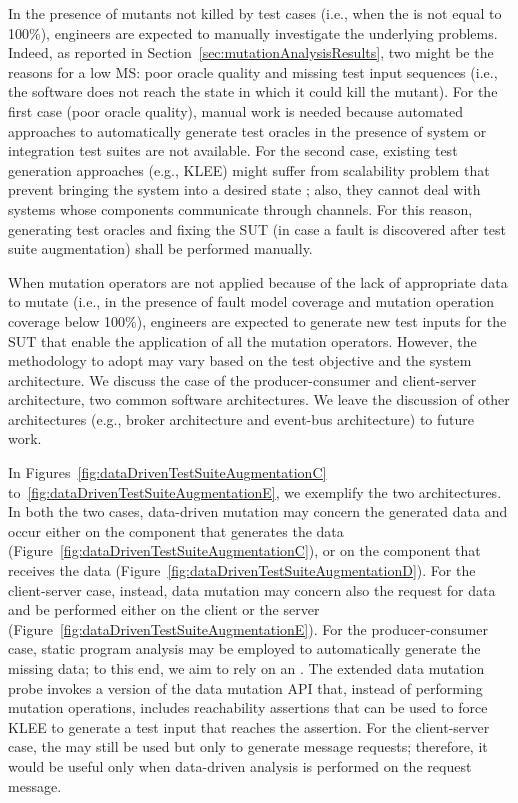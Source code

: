 In the presence of mutants not killed by test cases (i.e., when the   is not equal to 100\%), engineers are expected to manually investigate the underlying problems. Indeed, as reported in Section~\ref{sec:mutationAnalysisResults}, two might be the reasons for a low MS: poor oracle quality and missing test input sequences (i.e., the software does not reach the state in which it could kill the mutant).
For the first case (poor oracle quality), manual work is needed because automated approaches to automatically generate test oracles in the presence of system or integration test suites are not available. For the second case, existing test generation approaches (e.g., KLEE) might suffer from scalability problem that prevent bringing the system into a desired state ; also, they cannot deal with systems whose components communicate through channels. For this reason, generating test oracles and fixing the SUT (in case a fault is discovered after test suite augmentation) shall be performed manually.

When mutation operators are not applied because of the lack of appropriate data to mutate (i.e., in the presence of fault model coverage and mutation operation coverage below 100\%), engineers are expected to generate new test inputs for the SUT that enable the application of all the mutation operators. 
However, the methodology to adopt may vary based on the test objective and the system architecture. 
We discuss the case of the producer-consumer and client-server architecture, two common software architectures. We leave the discussion of other architectures (e.g., broker architecture and event-bus architecture) to future work.

\STARTCHANGEDFINAL

In Figures~\ref{fig:dataDrivenTestSuiteAugmentationC} to~\ref{fig:dataDrivenTestSuiteAugmentationE}, we exemplify the two architectures. In both the two cases, data-driven mutation may concern the generated data and occur either on the component that generates the data (Figure~\ref{fig:dataDrivenTestSuiteAugmentationC}), or on the component that receives the data (Figure~\ref{fig:dataDrivenTestSuiteAugmentationD}).
For the client-server case, instead, data mutation may concern also the request for data and be performed either on the client or the server (Figure~\ref{fig:dataDrivenTestSuiteAugmentationE}). For the producer-consumer case, static program analysis may be employed to automatically generate the missing data; to this end, we aim to rely on an . 
The extended data mutation probe invokes a version of the data mutation API that, instead of performing mutation operations, includes reachability assertions that can be used to force KLEE to generate a test input that reaches the assertion. 
For the client-server case, the  may still be used but only to generate message requests; therefore, it would be useful only when data-driven analysis is performed on the  request message. 

